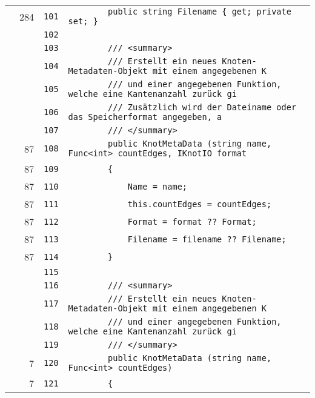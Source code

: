 \documentclass[a4paper,10pt]{article}
\begin{document}
\begin{longtable}[l]{lrrl}
\cellcolor{green} & 284 & \verb~101~ & \verb~        public string Filename { get; private set; }~\\
\cellcolor{gray} &  & \verb~102~ & \verb~~\\
\cellcolor{gray} &  & \verb~103~ & \verb~        /// <summary>~\\
\cellcolor{gray} &  & \verb~104~ & \verb~        /// Erstellt ein neues Knoten-Metadaten-Objekt mit einem angegebenen K~\\
\cellcolor{gray} &  & \verb~105~ & \verb~        /// und einer angegebenen Funktion, welche eine Kantenanzahl zurück gi~\\
\cellcolor{gray} &  & \verb~106~ & \verb~        /// Zusätzlich wird der Dateiname oder das Speicherformat angegeben, a~\\
\cellcolor{gray} &  & \verb~107~ & \verb~        /// </summary>~\\
\cellcolor{green} & 87 & \verb~108~ & \verb~        public KnotMetaData (string name, Func<int> countEdges, IKnotIO format~\\
\cellcolor{green} & 87 & \verb~109~ & \verb~        {~\\
\cellcolor{green} & 87 & \verb~110~ & \verb~            Name = name;~\\
\cellcolor{green} & 87 & \verb~111~ & \verb~            this.countEdges = countEdges;~\\
\cellcolor{green} & 87 & \verb~112~ & \verb~            Format = format ?? Format;~\\
\cellcolor{green} & 87 & \verb~113~ & \verb~            Filename = filename ?? Filename;~\\
\cellcolor{green} & 87 & \verb~114~ & \verb~        }~\\
\cellcolor{gray} &  & \verb~115~ & \verb~~\\
\cellcolor{gray} &  & \verb~116~ & \verb~        /// <summary>~\\
\cellcolor{gray} &  & \verb~117~ & \verb~        /// Erstellt ein neues Knoten-Metadaten-Objekt mit einem angegebenen K~\\
\cellcolor{gray} &  & \verb~118~ & \verb~        /// und einer angegebenen Funktion, welche eine Kantenanzahl zurück gi~\\
\cellcolor{gray} &  & \verb~119~ & \verb~        /// </summary>~\\
\cellcolor{green} & 7 & \verb~120~ & \verb~        public KnotMetaData (string name, Func<int> countEdges)~\\
\cellcolor{green} & 7 & \verb~121~ & \verb~        {~\\

\end{longtable}
\end{document}
